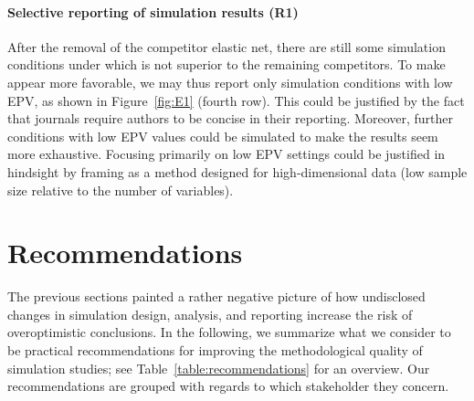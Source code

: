 \documentclass[a4paper, 11pt]{article}
\begin{document}
\paragraph{Selective reporting of simulation results (R1)}
After the removal of the competitor elastic net, there are still
some simulation conditions under which \ainet{} is not superior to
the remaining competitors. To make \ainet{} appear more favorable, we may
thus report only simulation conditions with low EPV, as shown in 
Figure~\ref{fig:E1} (fourth row). 
This could be justified by the fact that journals require 
authors to be concise in their reporting. 
Moreover, further conditions with low EPV values could be simulated to 
make the results seem more exhaustive.
Focusing primarily on low EPV settings could be justified in 
hindsight by framing \ainet{} as a method designed for high-dimensional 
data (low sample size relative to the number of variables).

\section{Recommendations}
\label{sec:recommendations}

The previous sections painted a rather negative picture of how 
undisclosed changes in simulation design, analysis, and reporting
increase the risk of overoptimistic conclusions. In the
following, we summarize what we consider to be practical recommendations for
improving the methodological quality of simulation studies; see
Table~\ref{table:recommendations} for an overview. Our recommendations are
grouped with regards to which stakeholder they concern.
\end{document}
